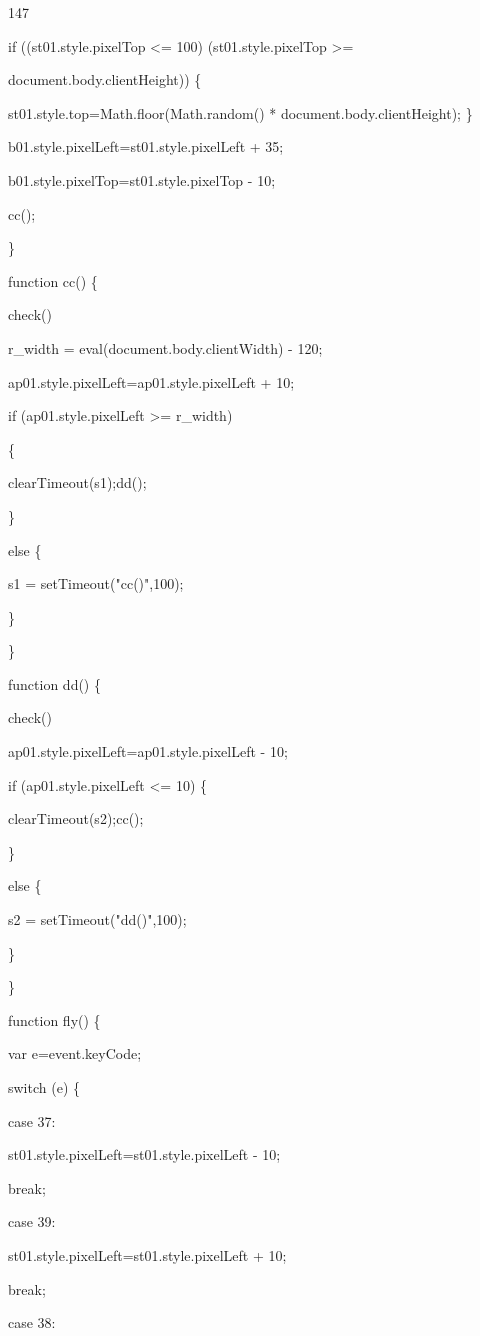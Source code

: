 \documentclass[
]{article}
\begin{document}
147

\protect\hypertarget{index_split_009.htmlux5cux23p148}{}{}if
((st01.style.pixelTop \textless= 100) \textbar\textbar{}
(st01.style.pixelTop \textgreater=

document.body.clientHeight)) \{

st01.style.top=Math.floor(Math.random() * document.body.clientHeight);
\}

b01.style.pixelLeft=st01.style.pixelLeft + 35;

b01.style.pixelTop=st01.style.pixelTop - 10;

cc();

\}

function cc() \{

check()

r\_width = eval(document.body.clientWidth) - 120;

ap01.style.pixelLeft=ap01.style.pixelLeft + 10;

if (ap01.style.pixelLeft \textgreater= r\_width)

\{

clearTimeout(s1);dd();

\}

else \{

s1 = setTimeout("cc()",100);

\}

\}

function dd() \{

check()

ap01.style.pixelLeft=ap01.style.pixelLeft - 10;

if (ap01.style.pixelLeft \textless= 10) \{

clearTimeout(s2);cc();

\}

else \{

s2 = setTimeout("dd()",100);

\}

\}

function fly() \{

var e=event.keyCode;

switch (e) \{

case 37:

st01.style.pixelLeft=st01.style.pixelLeft - 10;

break;

case 39:

st01.style.pixelLeft=st01.style.pixelLeft + 10;

break;

case 38:
\end{document}

